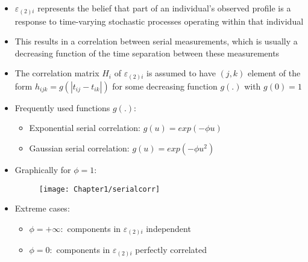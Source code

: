 \documentclass{beamer}
\begin{document}
\begin{frame}
\begin{itemize}
\item $\varepsilon_{(2)i}$ represents the belief that part of an individual’s observed profile is a response to time-varying stochastic processes operating within that individual \vspace{0.25cm}
\item This results in a correlation between serial measurements, which is usually a decreasing function of the time separation between these measurements \vspace{0.25cm}
\item The correlation matrix $H_i$ of $\varepsilon_{(2)i}$ is assumed to have $(j, k)$ element of the form $h_{ijk}=g(|t_{ij} − t_{ik}|)$ for some decreasing function $g(.)$ with $g(0) = 1$ \vspace{0.25cm}
\item Frequently used functions $g(.)$: \vspace{0.25cm}
\begin{itemize}
\item Exponential serial correlation: $g(u) = exp(-\phi u)$ \vspace{0.25cm}
\item Gaussian serial correlation: $g(u) = exp(-\phi u^2)$
\end{itemize}
\end{itemize}
\end{frame}

\begin{frame}
\begin{itemize}
\item Graphically for $\phi=1$:
\begin{figure}[h!]
\centering
\texttt{[image: Chapter1/serialcorr]}
\end{figure}
\item Extreme cases:
\begin{itemize}
\item $\phi=+\infty:$ components in $\varepsilon_{(2)i}$ independent
\item  $\phi=0:$ components in $\varepsilon_{(2)i}$ perfectly correlated
\end{itemize}
\end{itemize}
\end{frame}
\end{document}
